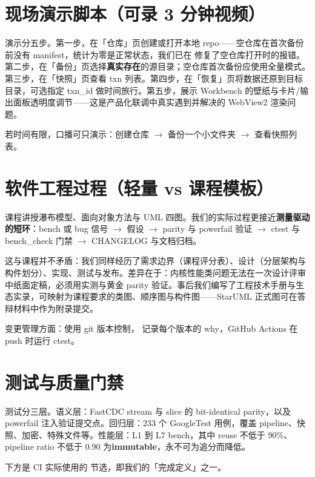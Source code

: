 \documentclass[11pt,a4paper,fontset=none]{ctexart}
\begin{document}
\section{现场演示脚本（可录 3 分钟视频）}

\begin{say}
演示分五步。第一步，在「仓库」页创建或打开本地 repo——空仓库在首次备份前没有 manifest，统计为零是正常状态，我们已在  修复了空仓库打开时的报错。第二步，在「备份」页选择\textbf{真实存在}的源目录；空仓库首次备份应使用全量模式。第三步，在「快照」页查看 txn 列表。第四步，在「恢复」页将数据还原到目标目录，可选指定 txn\_id 做时间旅行。第五步，展示 Workbench 的壁纸与卡片/输出面板透明度调节——这是产品化联调中真实遇到并解决的 WebView2 渲染问题。

若时间有限，口播可只演示：创建仓库 $\rightarrow$ 备份一个小文件夹 $\rightarrow$ 查看快照列表。
\end{say}

\section{软件工程过程（轻量 vs 课程模板）}

\begin{say}
课程讲授瀑布模型、面向对象方法与 UML 四图。我们的实际过程更接近\textbf{测量驱动的短环}：bench 或 bug 信号 $\rightarrow$ 假设 $\rightarrow$ parity 与 powerfail 验证 $\rightarrow$ ctest 与 bench\_check 门禁 $\rightarrow$ CHANGELOG 与文档归档。

这与课程并不矛盾：我们同样经历了需求边界（课程评分表）、设计（分层架构与构件划分）、实现、测试与发布。差异在于：内核性能类问题无法在一次设计评审中纸面定稿，必须用实测与黄金 parity 验证。事后我们编写了工程技术手册与生态实录，可映射为课程要求的类图、顺序图与构件图——StarUML 正式图可在答辩材料中作为附录提交。

变更管理方面：使用 git 版本控制， 记录每个版本的 why，GitHub Actions 在 push 时运行 ctest。
\end{say}

\section{测试与质量门禁}
\begin{say}
测试分三层。语义层：FastCDC stream 与 slice 的 bit-identical parity，以及 powerfail 注入验证提交点。回归层：233 个 GoogleTest 用例，覆盖 pipeline、快照、加密、特殊文件等。性能层：L1 到 L7 bench，其中 reuse 不低于 90\%、pipeline ratio 不低于 0.90 为\textbf{immutable}，永不可为追分而降低。

下方是 CI 实际使用的  节选，即我们的「完成定义」之一。
\end{say}
\showcifloor
\end{document}
